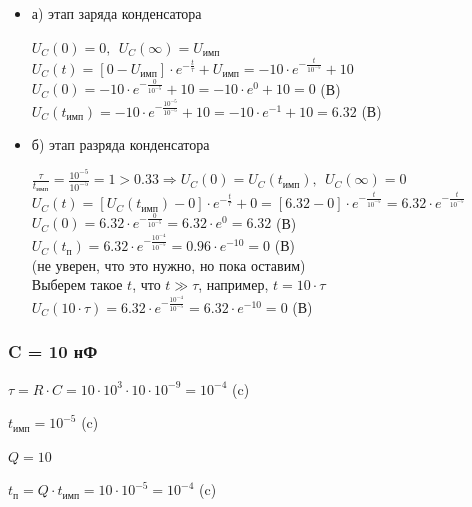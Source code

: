 \begin{itemize}
\item[] а) этап заряда конденсатора

		$U_C(0) = 0,\ \ U_C(\infty) = U_\text{имп}$\\
		$U_C(t) = [0 - U_\text{имп}] \cdot e^{-\frac{t}{\tau}} + U_\text{имп} = -10 \cdot e^{-\frac{t}{10^{-5}}} + 10$\\
		$U_C(0) = -10 \cdot e^{-\frac{0}{10^{-5}}} + 10 = -10 \cdot e^0 + 10 = 0$ (В)\\
		$U_C(t_\text{имп}) = -10 \cdot e^{-\frac{10^{-5}}{10^{-5}}} + 10 = -10 \cdot e^{-1} + 10 = 6.32$ (В)\\

\item[] б) этап разряда конденсатора

		$\frac{\tau}{t_\text{имп}} = \frac{10^{-5}}{10^{-5}} = 1 > 0.33 \Rightarrow U_C(0) = U_C(t_\text{имп}),\ \ U_C(\infty) = 0$\\
		$U_C(t) = [U_C(t_\text{имп}) - 0] \cdot e^{-\frac{t}{\tau}} + 0 =  [6.32 - 0] \cdot e^{-\frac{t}{10^{-5}}} = 6.32 \cdot e^{-\frac{t}{10^{-5}}}$\\
		$U_C(0) = 6.32 \cdot e^{-\frac{0}{10^{-5}}} = 6.32 \cdot e^0 = 6.32$ (В)\\
		$U_C(t_\text{п}) = 6.32 \cdot e^{-\frac{10^{-4}}{10^{-5}}} = 0.96 \cdot e^{-10} = 0$ (В)\\
		(не уверен, что это нужно, но пока оставим)\\
		Выберем такое $t$, что $t \gg \tau$, например, $t = 10 \cdot \tau$ \\
		$U_C( 10 \cdot \tau) = 6.32 \cdot e^{-\frac{10^{-4}}{10^{-5}}} = 6.32 \cdot e^{-10} = 0$ (В)\\		
		
\end{itemize}

\subsubsection{C = 10 нФ}

		$\tau = R \cdot C = 10 \cdot 10^3 \cdot 10 \cdot 10^{-9} = 10^{-4}$ (c)
		
		$t_\text{имп} = 10^{-5}$ (c)
		
		$Q = 10$		
		
		$t_\text{п} = Q \cdot t_\text{имп} = 10 \cdot 10^{-5} = 10^{-4}$ (c)

